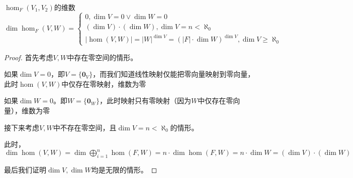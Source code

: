 \documentclass[12pt, a4paper, oneside, UTF8]{ctexbook}
\begin{document}
			\begin{them}{$\hom_F (V_1,V_2)$的维数}{}
				$\dim \hom_F (V,W)=\begin{cases}
					0, \dim V = 0 \vee \dim W=0 \\
					(\dim V)\cdot (\dim W),\dim V = n < \aleph_0 \\
					|\hom(V,W)|=|W|^{\dim V} = (|F|\cdot \dim W)^{\dim V},\dim V \geqslant \aleph_0
				\end{cases}$
			\end{them}
			\begin{proof}
				首先考虑$V,W$中存在零空间的情形。

				如果$\dim V=0$，即$V=\{\mathbf{0}_{V}\}$，而我们知道线性映射仅能把零向量映射到零向量，此时$\hom(V,W)$中仅存在零映射，维数为零

				如果$\dim W=0$。即$W=\{\mathbf{0}_W\}$，此时映射只有零映射（因为$W$中仅存在零向量），维数为零

				接下来考虑$V,W$中不存在零空间，且$\dim V = n < \aleph_0$的情形。

				此时，$\dim \hom(V,W) =\dim \bigoplus_{i=1}^{n} \hom(F,W) = n \cdot \dim \hom(F,W) = n \cdot \dim W = (\dim V)\cdot (\dim W)$

				最后我们证明$\dim V,\dim W$均是无限的情形。


			\end{proof}
	\ifx\allfiles\undefined
\end{document}
